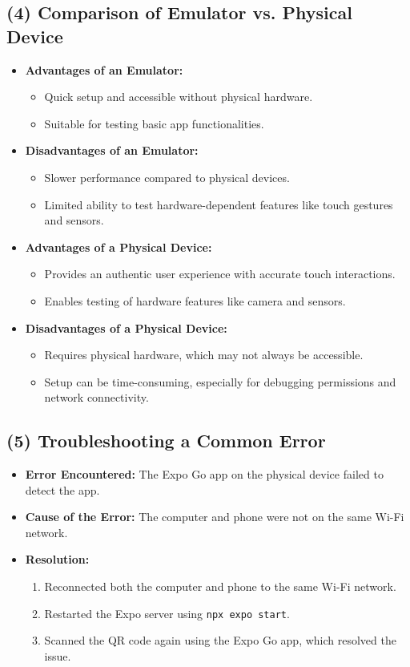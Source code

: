 \documentclass{article}
\begin{document}
\subsection*{(4) Comparison of Emulator vs. Physical Device}
\begin{itemize}
    \item \textbf{Advantages of an Emulator:}
    \begin{itemize}
        \item Quick setup and accessible without physical hardware.
        \item Suitable for testing basic app functionalities.
    \end{itemize}
    \item \textbf{Disadvantages of an Emulator:}
    \begin{itemize}
        \item Slower performance compared to physical devices.
        \item Limited ability to test hardware-dependent features like touch gestures and sensors.
    \end{itemize}
    \item \textbf{Advantages of a Physical Device:}
    \begin{itemize}
        \item Provides an authentic user experience with accurate touch interactions.
        \item Enables testing of hardware features like camera and sensors.
    \end{itemize}
    \item \textbf{Disadvantages of a Physical Device:}
    \begin{itemize}
        \item Requires physical hardware, which may not always be accessible.
        \item Setup can be time-consuming, especially for debugging permissions and network connectivity.
    \end{itemize}
\end{itemize}

\subsection*{(5) Troubleshooting a Common Error}
\begin{itemize}
    \item \textbf{Error Encountered:} The Expo Go app on the physical device failed to detect the app.
    \item \textbf{Cause of the Error:} The computer and phone were not on the same Wi-Fi network.
    \item \textbf{Resolution:}
    \begin{enumerate}
        \item Reconnected both the computer and phone to the same Wi-Fi network.
        \item Restarted the Expo server using \texttt{npx expo start}.
        \item Scanned the QR code again using the Expo Go app, which resolved the issue.
    \end{enumerate}
\end{itemize}
\end{document}
